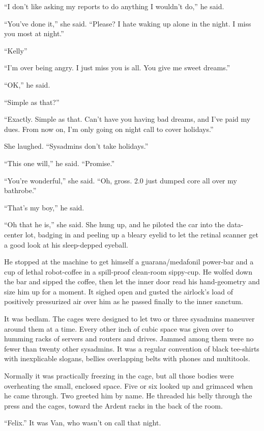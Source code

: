 “I don’t like asking my reports to do anything I wouldn’t do,” he
said.

“You’ve done it,” she said. “Please? I hate waking up alone in the
night. I miss you most at night.”

“Kelly\dash{}”

“I’m over being angry. I just miss you is all. You give me sweet
dreams.”

“OK,” he said.

“Simple as that?”

“Exactly. Simple as that. Can’t have you having bad dreams, and
I’ve paid my dues. From now on, I’m only going on night call to
cover holidays.”

She laughed. “Sysadmins don’t take holidays.”

“This one will,” he said. “Promise.”

“You’re wonderful,” she said. “Oh, gross. 2.0 just dumped core all
over my bathrobe.”

“That’s my boy,” he said.

“Oh that he is,” she said. She hung up, and he piloted the car into
the data-center lot, badging in and peeling up a bleary eyelid to
let the retinal scanner get a good look at his sleep-depped
eyeball.

He stopped at the machine to get himself a guarana/medafonil
power-bar and a cup of lethal robot-coffee in a spill-proof
clean-room sippy-cup. He wolfed down the bar and sipped the coffee,
then let the inner door read his hand-geometry and size him up for
a moment. It sighed open and gusted the airlock’s load of
positively pressurized air over him as he passed finally to the
inner sanctum.

It was bedlam. The cages were designed to let two or three
sysadmins maneuver around them at a time. Every other inch of cubic
space was given over to humming racks of servers and routers and
drives. Jammed among them were no fewer than twenty other
sysadmins. It was a regular convention of black tee-shirts with
inexplicable slogans, bellies overlapping belts with phones and
multitools.

Normally it was practically freezing in the cage, but all those
bodies were overheating the small, enclosed space. Five or six
looked up and grimaced when he came through. Two greeted him by
name. He threaded his belly through the press and the cages, toward
the Ardent racks in the back of the room.

“Felix.” It was Van, who wasn’t on call that night.

